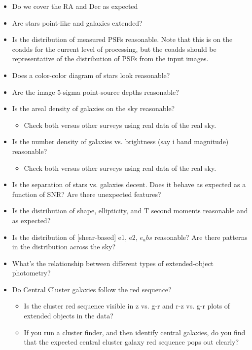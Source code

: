 \documentclass[11pt]{report}
\begin{document}
\begin{itemize}
  \item Do we cover the RA and Dec as expected
  \item Are stars point-like and galaxies extended?
  \item Is the distribution of measured PSFs reasonable.  Note that this is on the coadds for the current level of processing, but the coadds should be representative of the distribution of PSFs from the input images.
  \item Does a color-color diagram of stars look reasonable?
  \item Are the image 5-sigma point-source depths reasonable?
  \item Is the areal density of galaxies on the sky reasonable?
      \begin{itemize}
          \item Check both versus other surveys using real data of the real sky. 
      \end{itemize}
  \item Is the number density of galaxies vs. brightness (say i band magnitude) reasonable?
      \begin{itemize}
          \item Check both versus other surveys using real data of the real sky. 
      \end{itemize}
  \item Is the separation of stars vs. galaxies decent.  Does it behave as expected as a function of SNR?  Are there unexpected features?
  \item Is the distribution of shape, ellipticity, and T second moments reasonable and as expected?
  \item Is the distribution of [shear-based] e1, e2, $e_abs$ reasonable?  Are there patterns in the distribution across the sky?
  \item What's the relationship between different types of extended-object photometry?
  \item Do Central Cluster galaxies follow the red sequence?
  \begin{itemize}
      \item Is the cluster red sequence visible in z vs. g-r and r-z vs. g-r plots of extended objects in the data?
      \item If you run a cluster finder, and then identify central galaxies, do you find that the expected central cluster galaxy red sequence pops out clearly?
  \end{itemize}

\end{itemize}
\end{document}
